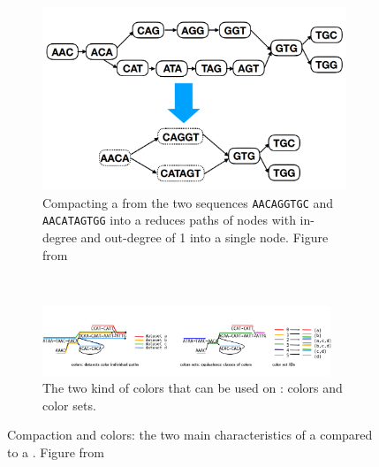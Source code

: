 \begin{figure}[h!]
	\centering
	\begin{subfigure}[b]{0.95\textwidth}
		\centering
		\includegraphics[width=.75\linewidth]{figures/background/compacting.png}
		\caption[Compacting a \dbg.]{Compacting a \dbg from the two sequences \texttt{AACAGGTGC} and \texttt{AACATAGTGG} into a \cdbg reduces paths of nodes with in-degree and out-degree of 1 into a single node. Figure from~\cite{embedding_dbg}}
	\end{subfigure}%
	\\
	\begin{subfigure}[b]{0.95\textwidth}
		\centering
		\includegraphics[width=0.95\textwidth]{figures/background/colors_dbg.png}
		\caption[The colors in a \ccdbg.]{The two kind of colors that can be used on \ccdbg: colors and color sets.} 
	\end{subfigure}
	\caption[Compaction and colors in a \ccdbg.]{Compaction and colors: the two main characteristics of a \ccdbg compared to a \dbg. Figure from~\cite{marchet_kmersets}}
	\label{fig:ccdbg}
\end{figure}

